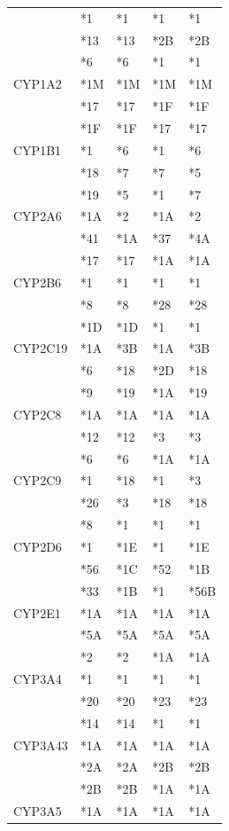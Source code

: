 \documentclass{report}
\begin{document}
\begin{tabularx}{\textwidth}{ X|XXXX }
& *1 & *1 & *1 & *1 \\
& *13 & *13 & *2B & *2B  \\
& *6 & *6 & *1 & *1 \\
\midrule
 CYP1A2
& *1M & *1M & *1M & *1M \\
& *17 & *17 & *1F & *1F  \\
& *1F & *1F & *17 & *17 \\
\midrule
 CYP1B1
& *1 & *6 & *1 & *6 \\
& *18 & *7 & *7 & *5  \\
& *19 & *5 & *1 & *7 \\
\midrule
 CYP2A6
& *1A & *2 & *1A & *2 \\
& *41 & *1A & *37 & *4A  \\
& *17 & *17 & *1A & *1A \\
\midrule
 CYP2B6
& *1 & *1 & *1 & *1 \\
& *8 & *8 & *28 & *28  \\
& *1D & *1D & *1 & *1 \\
\midrule
 CYP2C19
& *1A & *3B & *1A & *3B \\
& *6 & *18 & *2D & *18  \\
& *9 & *19 & *1A & *19 \\
\midrule
 CYP2C8
& *1A & *1A & *1A & *1A \\
& *12 & *12 & *3 & *3  \\
& *6 & *6 & *1A & *1A \\
\midrule
 CYP2C9
& *1 & *18 & *1 & *3 \\
& *26 & *3 & *18 & *18  \\
& *8 & *1 & *1 & *1 \\
\midrule
 CYP2D6
& *1 & *1E & *1 & *1E \\
& *56 & *1C & *52 & *1B  \\
& *33 & *1B & *1 & *56B \\
\midrule
 CYP2E1
& *1A & *1A & *1A & *1A \\
& *5A & *5A & *5A & *5A  \\
& *2 & *2 & *1A & *1A \\
\midrule
 CYP3A4
& *1 & *1 & *1 & *1 \\
& *20 & *20 & *23 & *23  \\
& *14 & *14 & *1 & *1 \\
\midrule
 CYP3A43
& *1A & *1A & *1A & *1A \\
& *2A & *2A & *2B & *2B  \\
& *2B & *2B & *1A & *1A \\
\midrule
 CYP3A5
& *1A & *1A & *1A & *1A \\

\end{tabularx}
\end{document}
